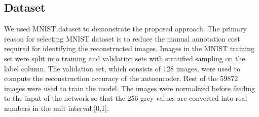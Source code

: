 \documentclass{uai2021} %
\begin{document}
\subsection{Dataset}
We used MNIST dataset\cite{lecun-mnisthandwrittendigit-2010} to demonstrate the proposed approach.
The primary reason for selecting MNIST dataset is to reduce the manual annotation cost required for identifying the reconstructed images.
Images in the MNIST training set were split into training and validation sets with stratified sampling on the label column.
The validation set, which consists of 128 images, were used to compute the reconstruction accuracy of the autoencoder.
Rest of the 59872 images were used to train the model.
The images were normalized  before feeding to the input of the network so that the 256 grey values are converted into real numbers in the unit interval [0,1].
\end{document}
